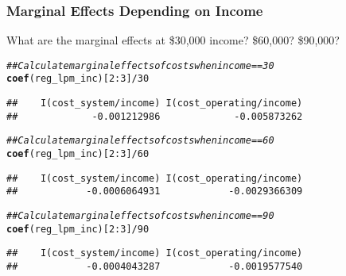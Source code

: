 \documentclass{beamer}\usepackage[]{graphicx}\usepackage[]{color}
\makeatletter
\newcommand{\hlnum}[1]{\textcolor[rgb]{0.686,0.059,0.569}{#1}}%
\newcommand{\hlcom}[1]{\textcolor[rgb]{0.678,0.584,0.686}{\textit{#1}}}%
\newcommand{\hlopt}[1]{\textcolor[rgb]{0,0,0}{#1}}%
\newcommand{\hlstd}[1]{\textcolor[rgb]{0.345,0.345,0.345}{#1}}%
\newcommand{\hlkwd}[1]{\textcolor[rgb]{0.737,0.353,0.396}{\textbf{#1}}}%
\newenvironment{kframe}{%
 \def\at@end@of@kframe{}%
 \ifinner\ifhmode%
  \def\at@end@of@kframe{\end{minipage}}%
  \begin{minipage}{\columnwidth}%
 \fi\fi%
 \def\FrameCommand##1{\hskip\@totalleftmargin \hskip-\fboxsep
 \colorbox{shadecolor}{##1}\hskip-\fboxsep
     \hskip-\linewidth \hskip-\@totalleftmargin \hskip\columnwidth}%
 \MakeFramed {\advance\hsize-\width
   \@totalleftmargin\z@ \linewidth\hsize
   \@setminipage}}%
 {\par\unskip\endMakeFramed%
 \at@end@of@kframe}
\newenvironment{knitrout}{}{} %
\makeatother
\begin{document}
\begin{frame}[fragile]\frametitle{Marginal Effects Depending on Income}
    What are the marginal effects at \$30,000 income? \$60,000? \$90,000?
\begin{knitrout}\footnotesize
{}\color{fgcolor}\begin{kframe}
\begin{alltt}
\hlcom{## Calculate marginal effects of costs when income == 30}
\hlkwd{coef}\hlstd{(reg_lpm_inc)[}\hlnum{2}\hlopt{:}\hlnum{3}\hlstd{]} \hlopt{/} \hlnum{30}
\end{alltt}
\begin{verbatim}
##    I(cost_system/income) I(cost_operating/income) 
##             -0.001212986             -0.005873262
\end{verbatim}
\begin{alltt}
\hlcom{## Calculate marginal effects of costs when income == 60}
\hlkwd{coef}\hlstd{(reg_lpm_inc)[}\hlnum{2}\hlopt{:}\hlnum{3}\hlstd{]} \hlopt{/} \hlnum{60}
\end{alltt}
\begin{verbatim}
##    I(cost_system/income) I(cost_operating/income) 
##            -0.0006064931            -0.0029366309
\end{verbatim}
\begin{alltt}
\hlcom{## Calculate marginal effects of costs when income == 90}
\hlkwd{coef}\hlstd{(reg_lpm_inc)[}\hlnum{2}\hlopt{:}\hlnum{3}\hlstd{]} \hlopt{/} \hlnum{90}
\end{alltt}
\begin{verbatim}
##    I(cost_system/income) I(cost_operating/income) 
##            -0.0004043287            -0.0019577540
\end{verbatim}
\end{kframe}
\end{knitrout}
\end{frame}
\end{document}
